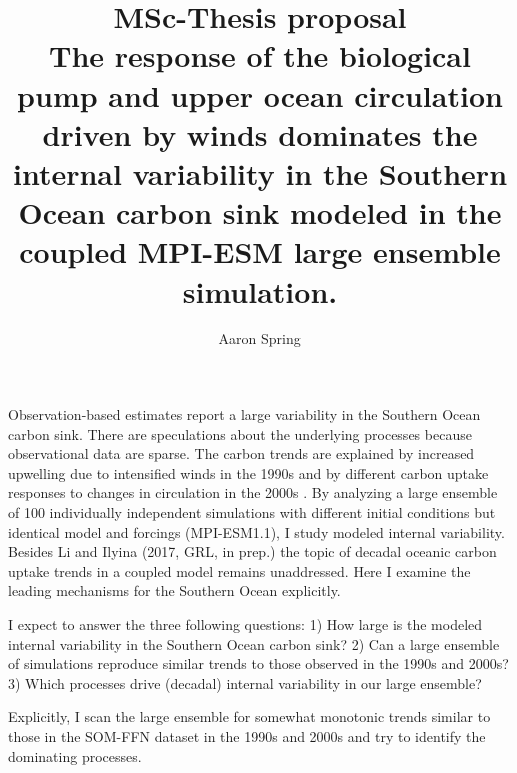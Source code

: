 \documentclass[12pt]{article}
\title{\vspace{-2cm} \textbf{MSc-Thesis proposal} \\ \vspace{1cm} The response of the biological pump and upper ocean circulation driven by winds dominates the internal variability in the Southern Ocean carbon sink modeled in the coupled MPI-ESM large ensemble simulation.}
\author
{Aaron Spring$^{}$%
}
\date{}
\begin{document}
 


\baselineskip24pt


\maketitle 

Observation-based estimates report a large variability in the Southern Ocean carbon sink. There are speculations about the underlying processes because observational data are sparse. The carbon trends are explained by increased upwelling due to intensified winds in the 1990s \citep{LeQuere2007,DeVries2017} and by different carbon uptake responses to changes in circulation in the 2000s \citep{landschuetzer2015}. By analyzing a large ensemble of 100 individually independent simulations with different initial conditions but identical model and forcings (MPI-ESM1.1), I study modeled internal variability. Besides Li and Ilyina (2017, GRL, in prep.) the topic of decadal oceanic carbon uptake trends in a coupled model remains unaddressed. Here I examine the leading mechanisms for the Southern Ocean explicitly.


I expect to answer the three following questions: 1) How large is the modeled internal variability in the Southern Ocean carbon sink? 2) Can a large ensemble of simulations reproduce similar trends to those observed in the 1990s and 2000s? 3) Which processes drive (decadal) internal variability in our large ensemble?

Explicitly, I scan the large ensemble for somewhat monotonic trends similar to those in the SOM-FFN dataset \citep{landschuetzer2015} in the 1990s and 2000s and try to identify the dominating processes. %
\end{document}
